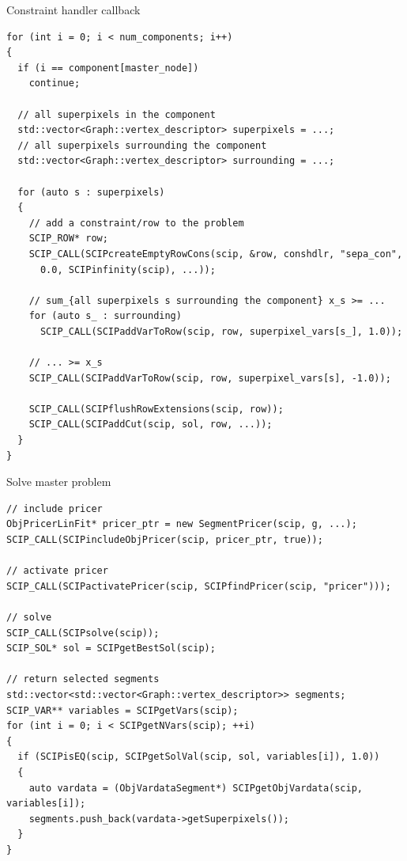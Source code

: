 \documentclass[fleqn]{beamer}
\begin{document}
    \begin{frame}[fragile]{Constraint handler callback}
        \begin{verbatim}
for (int i = 0; i < num_components; i++)
{
  if (i == component[master_node])
    continue;
    
  // all superpixels in the component
  std::vector<Graph::vertex_descriptor> superpixels = ...;
  // all superpixels surrounding the component
  std::vector<Graph::vertex_descriptor> surrounding = ...;
  
  for (auto s : superpixels)
  {
    // add a constraint/row to the problem
    SCIP_ROW* row;
    SCIP_CALL(SCIPcreateEmptyRowCons(scip, &row, conshdlr, "sepa_con",
      0.0, SCIPinfinity(scip), ...));

    // sum_{all superpixels s surrounding the component} x_s >= ...
    for (auto s_ : surrounding)
      SCIP_CALL(SCIPaddVarToRow(scip, row, superpixel_vars[s_], 1.0));

    // ... >= x_s
    SCIP_CALL(SCIPaddVarToRow(scip, row, superpixel_vars[s], -1.0));

    SCIP_CALL(SCIPflushRowExtensions(scip, row));
    SCIP_CALL(SCIPaddCut(scip, sol, row, ...));
  }
}
        \end{verbatim}
    \end{frame}

    \begin{frame}[fragile]{Solve master problem}
        \begin{verbatim}
// include pricer 
ObjPricerLinFit* pricer_ptr = new SegmentPricer(scip, g, ...);
SCIP_CALL(SCIPincludeObjPricer(scip, pricer_ptr, true));

// activate pricer 
SCIP_CALL(SCIPactivatePricer(scip, SCIPfindPricer(scip, "pricer")));

// solve
SCIP_CALL(SCIPsolve(scip));
SCIP_SOL* sol = SCIPgetBestSol(scip);

// return selected segments
std::vector<std::vector<Graph::vertex_descriptor>> segments;
SCIP_VAR** variables = SCIPgetVars(scip);
for (int i = 0; i < SCIPgetNVars(scip); ++i)
{
  if (SCIPisEQ(scip, SCIPgetSolVal(scip, sol, variables[i]), 1.0))
  {
    auto vardata = (ObjVardataSegment*) SCIPgetObjVardata(scip, variables[i]);
    segments.push_back(vardata->getSuperpixels());
  }
}
        \end{verbatim}
    \end{frame}
        
\end{document}
